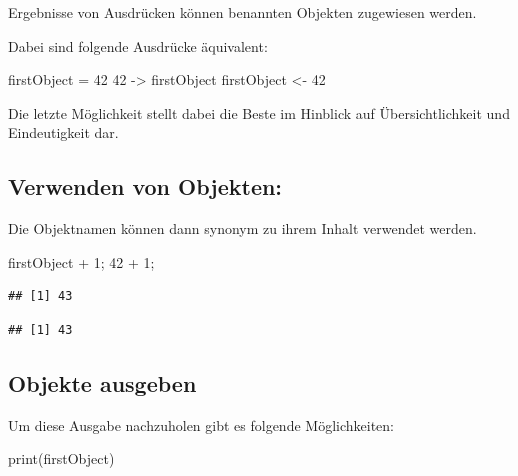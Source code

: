 \documentclass[
]{book}
\newenvironment{Shaded}{\begin{snugshade}}{\end{snugshade}}
\newcommand{\DecValTok}[1]{\textcolor[rgb]{0.00,0.00,0.81}{#1}}
\newcommand{\FunctionTok}[1]{\textcolor[rgb]{0.00,0.00,0.00}{#1}}
\newcommand{\NormalTok}[1]{#1}
\newcommand{\OtherTok}[1]{\textcolor[rgb]{0.56,0.35,0.01}{#1}}
\newcommand{\SpecialCharTok}[1]{\textcolor[rgb]{0.00,0.00,0.00}{#1}}
\begin{document}
Ergebnisse von Ausdrücken können benannten Objekten zugewiesen werden.

Dabei sind folgende Ausdrücke äquivalent:

\begin{Shaded}
\begin{Highlighting}[]
\NormalTok{firstObject }\OtherTok{=} \DecValTok{42}
\DecValTok{42} \OtherTok{{-}\textgreater{}}\NormalTok{ firstObject}
\NormalTok{firstObject }\OtherTok{\textless{}{-}} \DecValTok{42}
\end{Highlighting}
\end{Shaded}

Die letzte Möglichkeit stellt dabei die Beste im Hinblick auf Übersichtlichkeit und Eindeutigkeit dar.

\hypertarget{verwenden-von-objekten}{%
\subsection*{Verwenden von Objekten:}\label{verwenden-von-objekten}}

Die Objektnamen können dann synonym zu ihrem Inhalt verwendet werden.

\begin{Shaded}
\begin{Highlighting}[]
\NormalTok{firstObject }\SpecialCharTok{+} \DecValTok{1}\NormalTok{; }\DecValTok{42} \SpecialCharTok{+} \DecValTok{1}\NormalTok{;}
\end{Highlighting}
\end{Shaded}

\begin{verbatim}
## [1] 43
\end{verbatim}

\begin{verbatim}
## [1] 43
\end{verbatim}

\hypertarget{objekte-ausgeben}{%
\subsection*{Objekte ausgeben}\label{objekte-ausgeben}}

Um diese Ausgabe nachzuholen gibt es folgende Möglichkeiten:

\begin{Shaded}
\begin{Highlighting}[]
\FunctionTok{print}\NormalTok{(firstObject)}
\end{Highlighting}
\end{Shaded}
\end{document}

